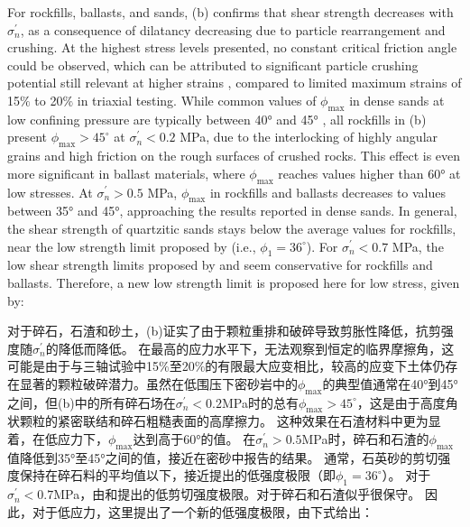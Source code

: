 \begin{ParaColumn}
    For rockfills, ballasts, and sands, (b) confirms that shear strength decreases with $\sigma_n^\prime$, as a consequence of dilatancy decreasing due to particle rearrangement and crushing. At the highest stress levels presented, no constant critical friction angle could be observed, which can be attributed to significant particle crushing potential still relevant at higher strains \citep{Coop2004157}, compared to limited maximum strains of 15$\%$ to 20$\%$ in triaxial testing. While common values of $\phi_{\max}$ in dense sands at low confining pressure are typically between 40° and 45° \citep{Bolton198665,Biarez19941,Schanz1996145}, all rockfills in (b) present $\phi_{\max}>45^\circ$ at $\sigma_n^\prime<0.2$ MPa, due to the interlocking of highly angular grains and high friction on the rough surfaces of crushed rocks. This effect is even more significant in ballast materials, where $\phi_{\max}$ reaches values higher than 60° at low stresses. At $\sigma_n^\prime>0.5$ MPa, $\phi_{\max}$ in rockfills and ballasts decreases to values between 35° and 45°, approaching the results reported in dense sands. In general, the shear strength of quartzitic sands stays below the average values for rockfills, near the low strength limit proposed by \citet{Leps19701159} (i.e., $\phi_1=36^\circ$). For $\sigma_n^\prime<0.7$ MPa, the low shear strength limits proposed by \citet{Leps19701159} and \citet{Indraratna1994539} seem conservative for rockfills and ballasts. Therefore, a new low strength limit is proposed here for low stress, given by:

    \switchcolumn

    对于碎石，石渣和砂土，(b)证实了由于颗粒重排和破碎导致剪胀性降低，抗剪强度随$\sigma_n^\prime$的降低而降低。 在最高的应力水平下，无法观察到恒定的临界摩擦角，这可能是由于与三轴试验中15$\%$至20$\%$的有限最大应变相比，较高的应变下土体仍存在显著的颗粒破碎潜力\citep{Coop2004157}。虽然在低围压下密砂岩中的$\phi_{\max}$的典型值通常在40°到45°之间\citep{Bolton198665,Biarez19941,Schanz1996145}，但(b)中的所有碎石场在$\sigma_n^\prime<0.2$MPa时的总有$\phi_{\max}>45^\circ$，这是由于高度角状颗粒的紧密联结和碎石粗糙表面的高摩擦力。 这种效果在石渣材料中更为显着，在低应力下，$\phi_{\max}$达到高于60°的值。 在$\sigma_n^\prime>0.5$MPa时，碎石和石渣的$\phi_{\max}$值降低到35°至45°之间的值，接近在密砂中报告的结果。 通常，石英砂的剪切强度保持在碎石料的平均值以下，接近\citet{Leps19701159}提出的低强度极限（即$\phi_1=36^\circ$）。 对于$\sigma_n^\prime<0.7$MPa，由\citet{Leps19701159}和\citet{Indraratna1994539}提出的低剪切强度极限。对于碎石和石渣似乎很保守。 因此，对于低应力，这里提出了一个新的低强度极限，由下式给出：


\end{ParaColumn}
